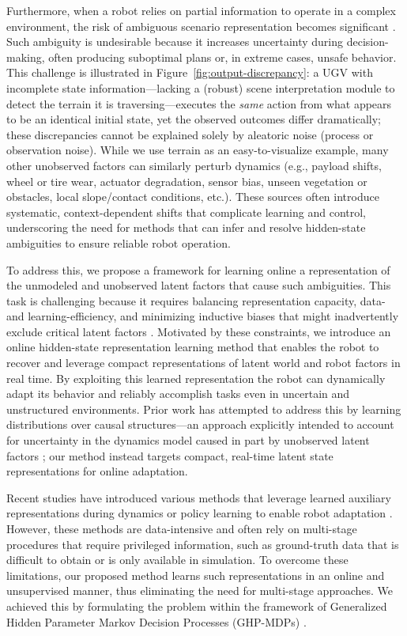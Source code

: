 \documentclass[Afour,sageh,times]{sagej}
\theoremstyle{lemma}
\begin{document}
Furthermore, when a robot relies on partial information to operate in a complex environment, the risk of ambiguous scenario representation becomes significant \cite[]{meyer2011using, pramanick2022talk, celemin2023knowledge}. Such ambiguity is undesirable because it increases uncertainty during decision-making, often producing suboptimal plans or, in extreme cases, unsafe behavior. This challenge is illustrated in Figure~\ref{fig:output-discrepancy}: a UGV with incomplete state information—lacking a (robust) scene interpretation module to detect the terrain it is traversing—executes the \textit{same} action from what appears to be an identical initial state, yet the observed outcomes differ dramatically; these discrepancies cannot be explained solely by aleatoric noise (process or observation noise). While we use terrain as an easy-to-visualize example, many other unobserved factors can similarly perturb dynamics (e.g., payload shifts, wheel or tire wear, actuator degradation, sensor bias, unseen vegetation or obstacles, local slope/contact conditions, etc.). These sources often introduce systematic, context-dependent shifts that complicate learning and control, underscoring the need for methods that can infer and resolve hidden-state ambiguities to ensure reliable robot operation.

To address this, we propose a framework for learning online a representation of the unmodeled and unobserved latent factors that cause such ambiguities. This task is challenging because it requires balancing representation capacity, data- and learning-efficiency, and minimizing inductive biases that might inadvertently exclude critical latent factors \cite[]{langdon2019uncovering, hundt2006representing}. Motivated by these constraints, we introduce an online hidden-state representation learning method that enables the robot to recover and leverage compact representations of latent world and robot factors in real time. By exploiting this learned representation the robot can dynamically adapt its behavior and reliably accomplish tasks even in uncertain and unstructured environments. Prior work has attempted to address this by learning distributions over causal structures—an approach explicitly intended to account for uncertainty in the dynamics model caused in part by unobserved latent factors \cite[]{murillogonzalez2025causaldistributions}; our method instead targets compact, real-time latent state representations for online adaptation. 


Recent studies have introduced various methods that leverage learned auxiliary representations during dynamics or policy learning to enable robot adaptation \cite[]{lee2020learning, kumar2021rma, kumar2022adapting, qi2023hand, liang2024rapid}. However, these methods are data-intensive and often rely on multi-stage procedures that require privileged information, such as ground-truth data that is difficult to obtain or is only available in simulation. To overcome these limitations, our proposed method learns such representations in an online and unsupervised manner, thus eliminating the need for multi-stage approaches. We achieved this by formulating the problem within the framework of Generalized Hidden Parameter Markov Decision Processes (GHP-MDPs) \cite[]{perez2020generalized, doshi2016hidden}. 
\end{document}
